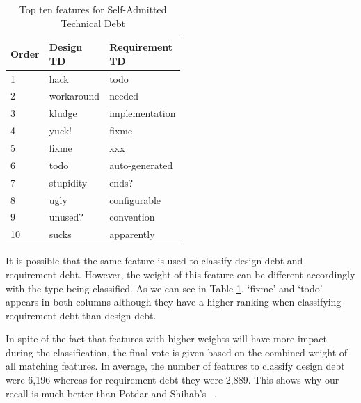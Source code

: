 \begin{table}[!thb]
    \begin{center}
        \caption{Top ten features for Self-Admitted Technical Debt}
        \label{tbl:top_ten_features}
        \begin{tabular}{l| l l }
        \toprule
        \textbf{Order} & \thead{Design\\TD} & \thead{Requirement\\TD}  \\
        \midrule
         1  & hack       &   todo              \\
         2  & workaround &   needed            \\
         3  & kludge     &   implementation    \\
         4  & yuck!      &   fixme             \\
         5  & fixme      &   xxx               \\
         6  & todo       &   auto-generated    \\
         7  & stupidity  &   ends?             \\
         8  & ugly       &   configurable      \\
         9  & unused?    &   convention        \\
         10 & sucks      &   apparently        \\
        \bottomrule
        \end{tabular}
    \end{center}    
\end{table}

It is possible that the same feature is used to classify design debt and requirement debt. However, the weight of this feature can be different accordingly with the type being classified. As we can see in Table \ref{tbl:top_ten_features}, `fixme' and `todo' appears in both columns although they have a higher ranking when classifying requirement debt than design debt. 

In spite of the fact that features with higher weights will have more impact during the classification, the final vote is given based on the combined weight of all matching features. In average, the number of features to classify design debt were 6,196 whereas for requirement debt they were 2,889. This shows why our recall is much better than Potdar and Shihab's ~\cite{Potdar2014ICSME}. 



